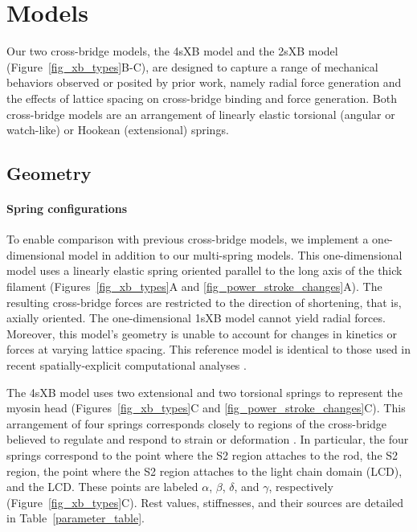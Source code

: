 \documentclass[10pt]{article}
\newcommand{\citep}[1]{\cite{#1}} %
\begin{document}


\section*{Models}  %

Our two cross-bridge models, the 4sXB model and the 2sXB model (Figure~\ref{fig_xb_types}B-C), are designed to capture a range of mechanical behaviors observed or posited by prior work, namely radial force generation and the effects of lattice spacing on cross-bridge binding and force generation.  
Both cross-bridge models are an arrangement of linearly elastic torsional (angular or watch-like) or Hookean (extensional) springs.  

\subsection*{Geometry} %

\paragraph{Spring configurations} %
To enable comparison with previous cross-bridge models, we implement a one-dimensional model in addition to our multi-spring models. 
This one-dimensional model uses a linearly elastic spring oriented parallel to the long axis of the thick filament (Figures~\ref{fig_xb_types}A and \ref{fig_power_stroke_changes}A).  
The resulting cross-bridge forces are restricted to the direction of shortening, that is, axially oriented. 
The one-dimensional 1sXB model cannot yield radial forces.
Moreover, this model's geometry is unable to account for changes in kinetics or forces at varying lattice spacing. 
This reference model is identical to those used in recent spatially-explicit computational analyses \citep{Daniel1998, Chase2004, Tanner2007}. 

The 4sXB model uses two extensional and two torsional springs to represent the myosin head (Figures~\ref{fig_xb_types}C and \ref{fig_power_stroke_changes}C).
This arrangement of four springs corresponds closely to regions of the cross-bridge believed to regulate and respond to strain or deformation \citep{Houdusse2001, Kohler2002}.
In particular, the four springs correspond to the point where the S2 region attaches to the rod, the S2 region, the point where the S2 region attaches to the light chain domain (LCD), and the LCD.
These points are labeled $\alpha$, $\beta$, $\delta$, and $\gamma$, respectively (Figure~\ref{fig_xb_types}C).
Rest values, stiffnesses, and their sources are detailed in Table~\ref{parameter_table}. 
\end{document}
